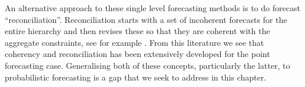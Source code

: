 \documentclass[12pt]{article}
\theoremstyle{definition}
\begin{document}
An alternative approach to these single level forecasting methods is to do forecast ``reconciliation''. Reconciliation starts with a set of incoherent forecasts for the entire hierarchy and then revises these so that they are coherent with the aggregate constraints, see for example \citet{AthEtAl2009, HynEtAl2011, VanErven2015a, ShaHyn2017}. From this literature we see that coherency and reconciliation has been extensively developed for the point forecasting case. Generalising both of these concepts, particularly the latter, to probabilistic forecasting is a gap that we seek to address in this chapter.

%

%
\end{document}
